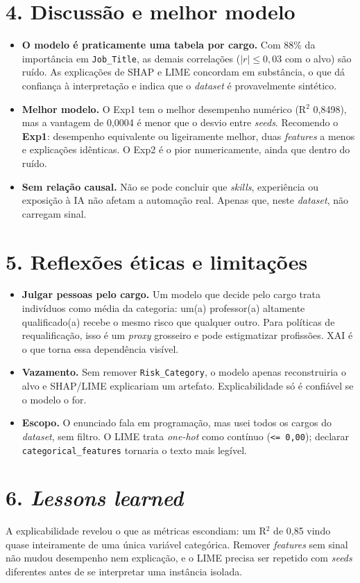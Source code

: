 \documentclass[10pt,a4paper]{article}
\begin{document}
\section*{4. Discuss\~ao e melhor modelo}
\begin{itemize}
  \item \textbf{O modelo \'e praticamente uma tabela por cargo.} Com 88\% da import\^ancia em \texttt{Job\_Title}, as demais correla\c{c}\~oes ($|r|\le 0{,}03$ com o alvo) s\~ao ru\'ido. As explica\c{c}\~oes de SHAP e LIME concordam em subst\^ancia, o que d\'a confian\c{c}a \`a interpreta\c{c}\~ao e indica que o \textit{dataset} \'e provavelmente sint\'etico.
  \item \textbf{Melhor modelo.} O Exp1 tem o melhor desempenho num\'erico (R$^2$ 0,8498), mas a vantagem de 0,0004 \'e menor que o desvio entre \textit{seeds}. Recomendo o \textbf{Exp1}: desempenho equivalente ou ligeiramente melhor, duas \textit{features} a menos e explica\c{c}\~oes id\^enticas. O Exp2 \'e o pior numericamente, ainda que dentro do ru\'ido.
  \item \textbf{Sem rela\c{c}\~ao causal.} N\~ao se pode concluir que \textit{skills}, experi\^encia ou exposi\c{c}\~ao \`a IA n\~ao afetam a automa\c{c}\~ao real. Apenas que, neste \textit{dataset}, n\~ao carregam sinal.
\end{itemize}

\section*{5. Reflex\~oes \'eticas e limita\c{c}\~oes}
\begin{itemize}
  \item \textbf{Julgar pessoas pelo cargo.} Um modelo que decide pelo cargo trata indiv\'iduos como m\'edia da categoria: um(a) professor(a) altamente qualificado(a) recebe o mesmo risco que qualquer outro. Para pol\'iticas de requalifica\c{c}\~ao, isso \'e um \textit{proxy} grosseiro e pode estigmatizar profiss\~oes. XAI \'e o que torna essa depend\^encia vis\'ivel.
  \item \textbf{Vazamento.} Sem remover \texttt{Risk\_Category}, o modelo apenas reconstruiria o alvo e SHAP/LIME explicariam um artefato. Explicabilidade s\'o \'e confi\'avel se o modelo o for.
  \item \textbf{Escopo.} O enunciado fala em programa\c{c}\~ao, mas usei todos os cargos do \textit{dataset}, sem filtro. O LIME trata \textit{one-hot} como cont\'inuo (\texttt{<= 0,00}); declarar \texttt{categorical\_features} tornaria o texto mais leg\'ivel.
\end{itemize}

\section*{6. \textit{Lessons learned}}
A explicabilidade revelou o que as m\'etricas escondiam: um R$^2$ de 0,85 vindo quase inteiramente de uma \'unica vari\'avel categ\'orica. Remover \textit{features} sem sinal n\~ao mudou desempenho nem explica\c{c}\~ao, e o LIME precisa ser repetido com \textit{seeds} diferentes antes de se interpretar uma inst\^ancia isolada.
\end{document}
